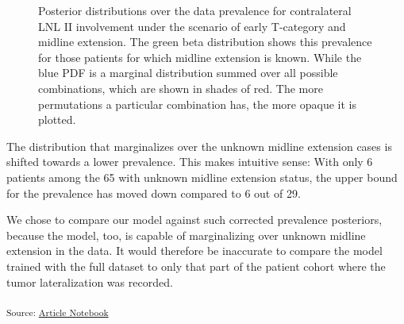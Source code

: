 \documentclass[
  sn-mathphys-num,
]{sn-jnl}
\begin{document}
\begin{figure}


\caption{\label{fig-model-marginal-pdf}Posterior distributions over the
data prevalence for contralateral LNL II involvement under the scenario
of early T-category and midline extension. The green beta distribution
shows this prevalence for those patients for which midline extension is
known. While the blue PDF is a marginal distribution summed over all
possible combinations, which are shown in shades of red. The more
permutations a particular combination has, the more opaque it is
plotted.}

\end{figure}%

The distribution that marginalizes over the unknown midline extension
cases is shifted towards a lower prevalence. This makes intuitive sense:
With only 6 patients among the 65 with unknown midline extension status,
the upper bound for the prevalence has moved down compared to 6 out of
29.

We chose to compare our model against such corrected prevalence
posteriors, because the model, too, is capable of marginalizing over
unknown midline extension in the data. It would therefore be inaccurate
to compare the model trained with the full dataset to only that part of
the patient cohort where the tumor lateralization was recorded.

\textsubscript{Source:
\href{https://rmnldwg.github.io/bilateral-paper/manuscript-preview.html}{Article
Notebook}}


  
\end{document}
